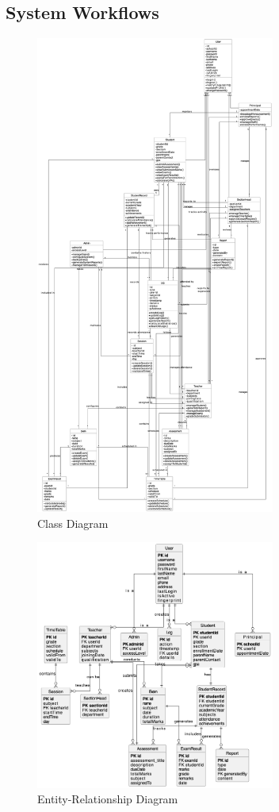 \documentclass[12pt,a4paper]{report}
\begin{document}
\subsection{System Workflows}
\begin{figure}[htbp]
    \centering
    \includegraphics[width=0.7\textwidth]{class-diagram.png}
    \caption{Class Diagram}
    \label{fig:class-diagram}
\end{figure}

\begin{figure}[htbp]
    \centering
    \includegraphics[width=0.7\textwidth]{er-diagram.png}
    \caption{Entity-Relationship Diagram}
    \label{fig:er-diagram}
\end{figure}
\end{document}
